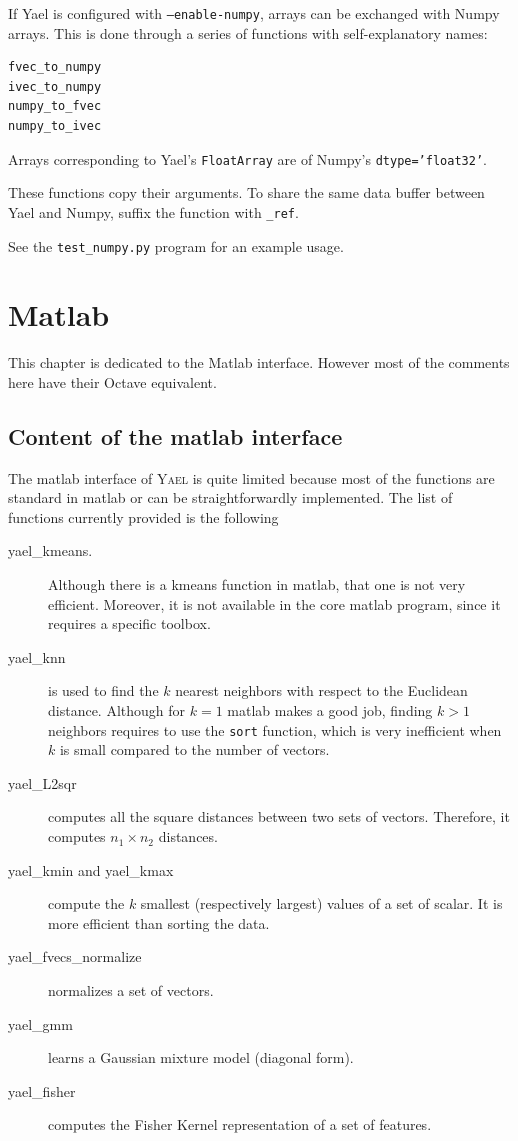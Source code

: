 \documentclass[a4paper,11pt,notitlepage,final,twoside]{report}
\newcommand{\yael}{\textsc{Yael}\xspace}
\newcommand{\tc}[1]{\texttt{#1}}
\begin{document}
If Yael is configured with \tc{--enable-numpy}, arrays can be
exchanged with Numpy arrays. This is done through a series of functions with self-explanatory names: 

\begin{verbatim}
fvec_to_numpy 
ivec_to_numpy 
numpy_to_fvec 
numpy_to_ivec 
\end{verbatim}

Arrays corresponding to Yael's \tc{FloatArray} are of Numpy's \tc{dtype='float32'}.  

These functions copy their arguments. To share the same data buffer between Yael and Numpy, suffix the function with \tc{\_ref}. 

See the \tc{test\_numpy.py} program for an example usage. 

\chapter{Matlab}

This chapter is dedicated to the Matlab interface. 
However most of the comments here have their Octave equivalent. 

\section{Content of the matlab interface}

The matlab interface of \yael is quite limited because most 
of the functions are standard in matlab or can be straightforwardly 
implemented. 
The list of functions currently provided is the following
\begin{description}
\item  [yael\_kmeans.] Although there is a kmeans function in matlab, 
that one is not very efficient. Moreover, it is not available in 
the core matlab program, since it requires a specific toolbox. 
\item [yael\_knn] is used to find the $k$ nearest neighbors with respect 
to the Euclidean distance. Although for $k=1$ matlab makes a good job, 
finding $k>1$ neighbors requires to use the \tc{sort} 
function, which is very inefficient when $k$ is small compared to the number 
of vectors. 
\item [yael\_L2sqr] computes all the square distances between two sets of vectors. 
Therefore, it computes $n_1\times n_2$ distances. 
\item [yael\_kmin and yael\_kmax] compute the $k$ smallest (respectively largest) 
values of a set of scalar. It is more efficient than sorting the data. 
\item [yael\_fvecs\_normalize] normalizes a set of vectors. 
\item [yael\_gmm] learns a Gaussian mixture model (diagonal form).
\item [yael\_fisher] computes the Fisher Kernel representation of a set of features. 
\end{description}
\end{document}

